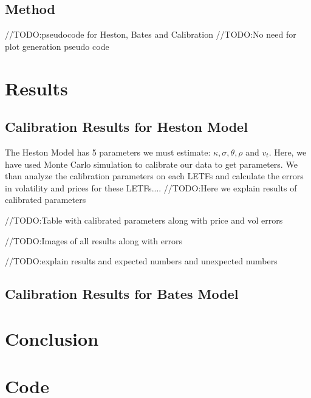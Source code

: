 \documentclass{article}
\begin{document}
\subsection{Method}

//TODO:pseudocode for Heston, Bates and Calibration
//TODO:No need for plot generation pseudo code

\section{Results}
\subsection{Calibration Results for Heston Model}
The Heston Model has 5 parameters we must estimate: $\kappa, \sigma, \theta, \rho$ and $v_t$. Here, we have used Monte Carlo simulation to calibrate our data to get parameters. We than analyze the calibration parameters on each LETFs and calculate the errors in volatility and prices for these LETFs....
//TODO:Here we explain results of calibrated parameters

//TODO:Table with calibrated parameters along with price and vol errors

//TODO:Images of all results along with errors

//TODO:explain results and expected numbers and unexpected numbers

\subsection{Calibration Results for Bates Model}
\section{Conclusion}
\section{Code}




\citep{ref1}
\citep{ref2}
\citep{ref3}
\citep{ref4}
\citep{ref5}
\end{document}
